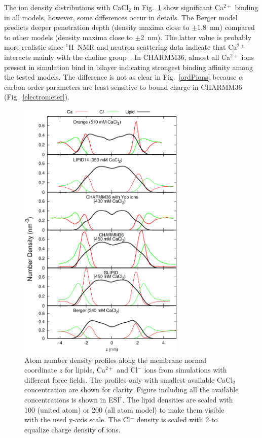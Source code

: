 \documentclass[twoside,twocolumn,9pt]{article}
\begin{document}
The ion density distributions with CaCl$_2$ in Fig.~\ref{CAdensitiesCLEAR} show significant
Ca$^{2+}$ binding in all models, however, some differences occur in details.
The Berger model predicts deeper penetration depth (density maxima close to $\pm$1.8~nm) compared
to other models (density maxima close to $\pm$2~nm). The latter value is probably more realistic 
since $^1$H~NMR and neutron scattering data indicate that Ca$^{2+}$ interacts mainly with the 
choline group~\cite{hauser76,hauser78,herbette84,cevc90}. In CHARMM36, almost all Ca$^{2+}$
ions present in simulation bind in bilayer indicating strongest binding affinity among the tested
models. The difference is not as clear in Fig.~\ref{ordPions} because $\alpha$ carbon order parameters 
are least sensitive to bound charge in CHARMM36 (Fig.~\ref{electrometer}).
\begin{figure}[t]
  \centering
  \includegraphics[width=8cm]{../Fig/CAdensitiesCLEAR.eps}
  \caption{\label{CAdensitiesCLEAR}
    Atom number density profiles along the membrane normal coordinate $z$ for lipids, Ca$^{2+}$ and Cl$^-$ ions from simulations 
    with different force fields.
    The profiles only with smallest available CaCl$_2$ concentration are shown for clarity.
    Figure including all the available concentrations is shown in ESI$^\dag$.
    The lipid densities are scaled with 100 (united atom) or 200 (all atom model) to make them visible with the used y-axis scale.
    The Cl$^-$ density is scaled with 2 to equalize charge density of ions.
  }
\end{figure}
\end{document}
